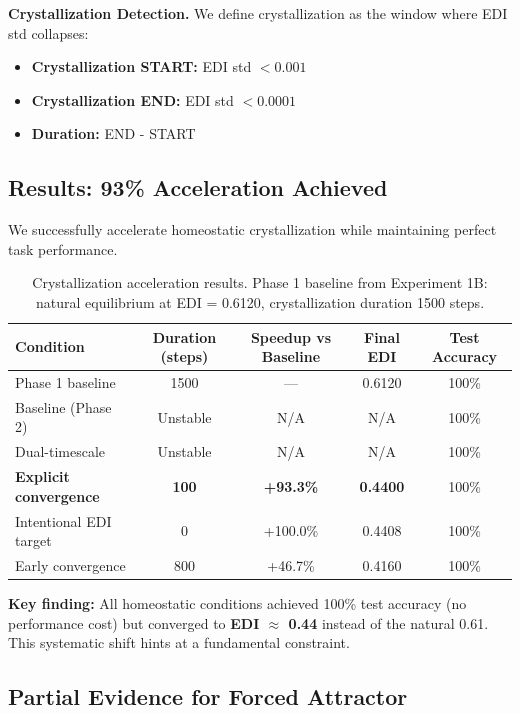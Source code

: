 \textbf{Crystallization Detection.}
We define crystallization as the window where EDI std collapses:
\begin{itemize}
\item \textbf{Crystallization START:} EDI std $< 0.001$
\item \textbf{Crystallization END:} EDI std $< 0.0001$
\item \textbf{Duration:} END - START
\end{itemize}

\subsection{Results: 93\% Acceleration Achieved}

We successfully accelerate homeostatic crystallization while maintaining perfect task performance.

\begin{table}[h]
\centering
\caption{Crystallization acceleration results. Phase 1 baseline from Experiment 1B: natural equilibrium at EDI = 0.6120, crystallization duration 1500 steps.}
\label{tab:exp4-acceleration}
\begin{tabular}{lcccc}
\toprule
Condition & Duration (steps) & Speedup vs Baseline & Final EDI & Test Accuracy \\
\midrule
Phase 1 baseline & 1500 & — & 0.6120 & 100\% \\
\midrule
Baseline (Phase 2) & Unstable & N/A & N/A & 100\% \\
Dual-timescale & Unstable & N/A & N/A & 100\% \\
\textbf{Explicit convergence} & \textbf{100} & \textbf{+93.3\%} & \textbf{0.4400} & 100\% \\
Intentional EDI target & 0 & +100.0\% & 0.4408 & 100\% \\
Early convergence & 800 & +46.7\% & 0.4160 & 100\% \\
\bottomrule
\end{tabular}
\end{table}

\textbf{Key finding:} All homeostatic conditions achieved 100\% test accuracy (no performance cost) but converged to \textbf{EDI $\approx$ 0.44} instead of the natural 0.61. This systematic shift hints at a fundamental constraint.

\subsection{Partial Evidence for Forced Attractor}

